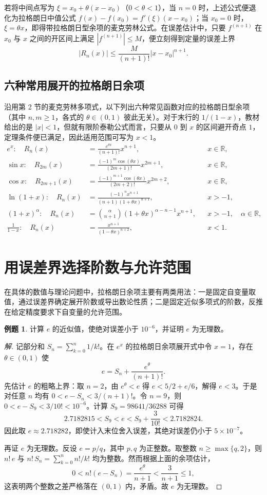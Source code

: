 \documentclass[UTF8,fontset=fandol,a4paper,12pt]{ctexart}
\theoremstyle{definition}
\newtheorem{example}[theorem]{例题}
\begin{document}
若将中间点写为 $\xi=x_0+\theta(x-x_0)$（$0<\theta<1$），当 $n=0$ 时，上述公式便退化为拉格朗日中值公式 $f(x)-f(x_0)=f'(\xi)(x-x_0)$；当 $x_0=0$ 时，$\xi=\theta x$，即得带拉格朗日型余项的麦克劳林公式。在误差估计中，只要 $f^{(n+1)}$ 在 $x_0$ 与 $x$ 之间的开区间上满足 $|f^{(n+1)}|\le M$，便立刻得到定量的误差上界
\[
 |R_n(x)|\le\frac{M}{(n+1)!}|x-x_0|^{n+1}.
\]

\subsection{六种常用展开的拉格朗日余项}
沿用第 2 节的麦克劳林多项式，以下列出六种常见函数对应的拉格朗日型余项（其中 $n,m\ge1$，各式的 $\theta\in(0,1)$ 彼此无关）。对于末行的 $1/(1-x)$，教材给出的是 $|x|<1$，但就有限阶泰勒公式而言，只要从 $0$ 到 $x$ 的区间避开奇点 $1$，定理条件便已满足，因此适用范围可写为 $x<1$。
\begin{align*}
 e^x\colon\quad R_n(x)
   &=\frac{e^{\theta x}}{(n+1)!}x^{n+1}, && x\in\mathbb R,\\
 \sin x\colon\quad R_{2m}(x)
   &=\frac{(-1)^m\cos(\theta x)}{(2m+1)!}x^{2m+1}, && x\in\mathbb R,\\
 \cos x\colon\quad R_{2m+1}(x)
   &=\frac{(-1)^{m+1}\cos(\theta x)}{(2m+2)!}x^{2m+2}, && x\in\mathbb R,\\
 \ln(1+x)\colon\quad R_n(x)
   &=\frac{(-1)^n x^{n+1}}{(n+1)(1+\theta x)^{n+1}}, && x>-1,\\
 (1+x)^\alpha\colon\quad R_n(x)
   &=\binom{\alpha}{n+1}(1+\theta x)^{\alpha-n-1}x^{n+1}, && x>-1,\quad\alpha\in\mathbb R,\\
 \frac{1}{1-x}\colon\quad R_n(x)
   &=\frac{x^{n+1}}{(1-\theta x)^{n+2}}, && x<1.
\end{align*}

\section{用误差界选择阶数与允许范围}
在具体的数值与理论问题中，拉格朗日余项主要有两类用法：一是固定自变量取值，通过误差界确定展开阶数或导出数论性质；二是固定近似多项式的阶数，反推在给定精度要求下自变量的允许范围。

\begin{example}
计算 $e$ 的近似值，使绝对误差小于 $10^{-6}$，并证明 $e$ 为无理数。
\end{example}

\begin{proof}[解]
记部分和 $S_n=\sum_{k=0}^n 1/k!$。在 $e^x$ 的拉格朗日余项展开式中令 $x=1$，存在 $\theta\in(0,1)$ 使
\[
 e=S_n+\frac{e^\theta}{(n+1)!}.
\]
先估计 $e$ 的粗略上界：取 $n=2$，由 $e^\theta<e$ 得 $e<5/2+e/6$，解得 $e<3$。于是对任意 $n$ 均有 $0<e-S_n<3/(n+1)!$。令 $n=9$，则 $0<e-S_9<3/10!<10^{-6}$。计算 $S_9=98641/36288$ 可得
\[
 2.7182815<S_9<e<S_9+\frac{3}{10!}<2.7182824.
\]
因此取 $e\approx2.718282$，即使计入末位舍入误差，其绝对误差仍小于 $5\times10^{-7}$。

再证 $e$ 为无理数。反设 $e=p/q$，其中 $p,q$ 为正整数。取整数 $n\ge\max\{q,2\}$，则 $n!\,e$ 与 $n!\,S_n=\sum_{k=0}^n n!/k!$ 均为整数。然而根据上面的余项估计，
\[
 0<n!(e-S_n)=\frac{e^\theta}{n+1}<\frac{3}{n+1}\le1,
\]
这表明两个整数之差严格落在 $(0,1)$ 内，矛盾。故 $e$ 为无理数。
\end{proof}
\end{document}

